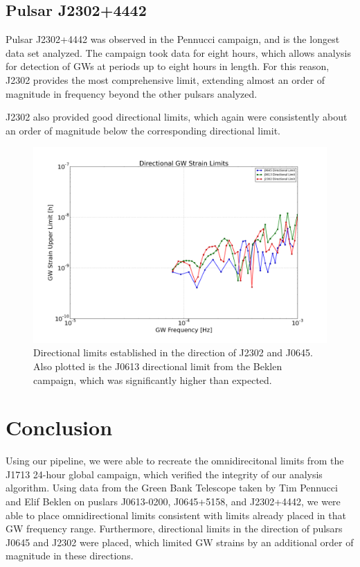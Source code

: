 \documentclass[12pt]{article}
\begin{document}
\subsection{Pulsar J2302+4442}

Pulsar J2302+4442 was observed in the Pennucci campaign, and is the longest data
set analyzed. The campaign took data for eight hours, which allows analysis for
detection of GWs at periods up to eight hours in length. For this reason, J2302
provides the most comprehensive limit, extending almost an order of magnitude in
frequency beyond the other pulsars analyzed.

J2302 also provided good directional limits, which again were consistently about
an order of magnitude below the corresponding directional limit.

\begin{figure}
    \caption{Directional limits established in the direction of J2302 and J0645.
    Also plotted is the J0613 directional limit from the Beklen campaign, which was significantly higher
    than expected.}
    \includegraphics[width=1\textwidth]{./figures/all_directional_July_limits.png}
\end{figure}

\section{Conclusion}
    Using our pipeline, we were able to recreate the omnidirecitonal limits from the J1713 24-hour global campaign, which verified the
integrity of our analysis algorithm. Using data from the Green Bank Telescope
taken by Tim Pennucci and Elif Beklen on puslars J0613-0200, J0645+5158, and
J2302+4442, we
were able to place omnidirectional limits consistent with limits already placed
in that GW frequency range. 
    Furthermore, directional limits in the direction of pulsars J0645 and J2302
    were placed, which limited GW strains by an additional order of magnitude in
    these directions.
\end{document}
